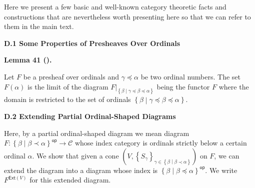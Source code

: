 \documentclass[10pt,a4paper]{article}
\begin{document}
 
Here we present a few basic and well-known category theoretic facts and constructions that are nevertheless worth presenting here so that we can refer to them in the main text.\par
 
 
 
\par\medskip\noindent\textbf{D.1 Some Properties of Presheaves Over Ordinals}\par
 
 
\par\medskip\noindent\textbf{Lemma 41 ().}\par
 
 
Let $F$ be a presheaf over ordinals and $\gamma\preceq\alpha$ be two ordinal numbers. The set $F(\alpha)$ is the limit of the diagram ${\left.F\right|}_{\left\{\beta\middle|\gamma\preceq\beta\preceq\alpha\right\}}$ being the functor $F$ where the domain is restricted to the set of ordinals $\left\{\beta\middle|\gamma\preceq\beta\preceq\alpha\right\}$.\par
 
 
 
 
 
\par\medskip\noindent\textbf{D.2 Extending Partial Ordinal-Shaped Diagrams}\par
 
 
Here, by a partial ordinal-shaped diagram we mean diagram $F:{\left\{\beta\middle|\beta\prec\alpha\right\}}^{\mathsf{op}}\to\mathcal{C}$ whose index category is ordinals strictly below a certain ordinal $\alpha$. We show that given a cone $(V,\left\{S_{\gamma}\right\}_{\gamma\in\left\{\beta\middle|\beta\prec\alpha\right\}})$ on $F$, we can extend the diagram into a diagram whose index is ${\left\{\beta\middle|\beta\preceq\alpha\right\}}^{\mathsf{op}}$. We write $F^{\mathsf{Ext}(V)}$ for this extended diagram.\par
 
\end{document}
